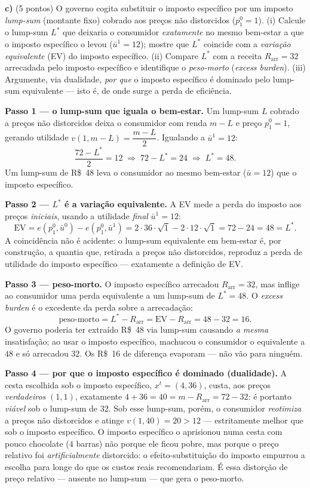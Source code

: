 \textbf{c)} (5 pontos) O governo cogita substituir o imposto específico por um imposto \emph{lump-sum} (montante fixo) cobrado aos preços não distorcidos ($p_1^{0}=1$). (i) Calcule o lump-sum $L^{*}$ que deixaria o consumidor \emph{exatamente} no mesmo bem-estar a que o imposto específico o levou ($\bar u^{1}=12$); mostre que $L^{*}$ coincide com a \emph{variação equivalente} (EV) do imposto específico. (ii) Compare $L^{*}$ com a receita $R_{\text{arr}}=32$ arrecadada pelo imposto específico e identifique o \emph{peso-morto} (\emph{excess burden}). (iii) Argumente, via dualidade, \emph{por que} o imposto específico é dominado pelo lump-sum equivalente --- isto é, de onde surge a perda de eficiência.
\resolucaobox{7.2cm}
\begin{solucao}
\textbf{Passo 1 --- o lump-sum que iguala o bem-estar.} Um lump-sum $L$ cobrado a preços não distorcidos deixa o consumidor com renda $m-L$ e preço $p_1^{0}=1$, gerando utilidade $v(1,m-L)=\dfrac{m-L}{2}$. Igualando a $\bar u^{1}=12$:
\[
\frac{72-L^{*}}{2}=12\;\Rightarrow\; 72-L^{*}=24\;\Rightarrow\; L^{*}=48.
\]
Um lump-sum de R\$~48 leva o consumidor ao mesmo bem-estar ($\bar u=12$) que o imposto específico.

\textbf{Passo 2 --- $L^{*}$ é a variação equivalente.} A EV mede a perda do imposto aos preços \emph{iniciais}, usando a utilidade \emph{final} $\bar u^{1}=12$:
\[
\mathrm{EV}=e(p_1^{0},\bar u^{0})-e(p_1^{0},\bar u^{1})=2\cdot 36\cdot\sqrt{1}-2\cdot 12\cdot\sqrt{1}=72-24=48=L^{*}.
\]
A coincidência não é acidente: o lump-sum equivalente em bem-estar é, por construção, a quantia que, retirada a preços não distorcidos, reproduz a perda de utilidade do imposto específico --- exatamente a definição de EV.

\textbf{Passo 3 --- peso-morto.} O imposto específico arrecadou $R_{\text{arr}}=32$, mas inflige ao consumidor uma perda equivalente a um lump-sum de $L^{*}=48$. O \emph{excess burden} é o excedente da perda sobre a arrecadação:
\[
\text{peso-morto}=L^{*}-R_{\text{arr}}=\mathrm{EV}-R_{\text{arr}}=48-32=16.
\]
O governo poderia ter extraído R\$~48 via lump-sum causando \emph{a mesma} insatisfação; ao usar o imposto específico, machucou o consumidor o equivalente a $48$ e só arrecadou $32$. Os R\$~16 de diferença evaporam --- não vão para ninguém.

\textbf{Passo 4 --- por que o imposto específico é dominado (dualidade).} A cesta escolhida sob o imposto específico, $x^{t}=(4,36)$, custa, aos preços \emph{verdadeiros} $(1,1)$, exatamente $4+36=40=m-R_{\text{arr}}=72-32$: é portanto \emph{viável} sob o lump-sum de $32$. Sob esse lump-sum, porém, o consumidor \emph{reotimiza} a preços não distorcidos e atinge $v(1,40)=20>12$ --- estritamente melhor que sob o imposto específico. O imposto específico o aprisionou numa cesta com pouco chocolate ($4$ barras) não porque ele ficou pobre, mas porque o preço relativo foi \emph{artificialmente} distorcido: o efeito-substituição do imposto empurrou a escolha para longe do que os custos reais recomendariam. É essa distorção de preço relativo --- ausente no lump-sum --- que gera o peso-morto.


\end{solucao}
